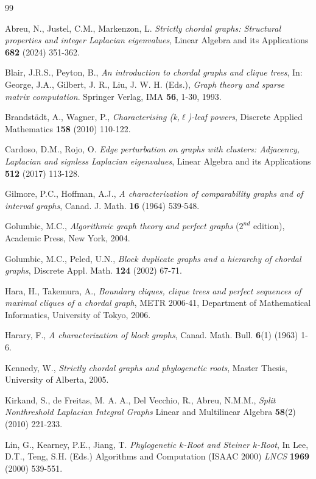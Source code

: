 \documentclass[preprint,12pt]{elsarticle}
\begin{document}
\begin{thebibliography}{99}

Abreu, N., Justel, C.M., Markenzon, L.
{\it Strictly chordal graphs: Structural properties and integer Laplacian eigenvalues},
Linear Algebra and its Applications {\bf 682} (2024) 351-362.

Blair, J.R.S., Peyton, B., 
{\it An introduction to chordal graphs and clique trees}, 
In:  George, J.A., Gilbert, J. R., Liu, J. W. H. (Eds.), 
\textit{Graph theory and sparse matrix computation}. Springer Verlag, IMA {\bf 56}, 1-30, 1993.

Brandstädt, A., Wagner, P.,
{\it Characterising (k,$\ell$)-leaf powers}, 
Discrete Applied Mathematics {\bf 158} (2010) 110-122.

Cardoso, D.M., Rojo, O. 
{\it Edge perturbation on graphs with clusters: Adjacency, Laplacian and signless Laplacian eigenvalues}, 
Linear Algebra and its Applications {\bf 512} (2017) 113-128.

Gilmore, P.C.,  Hoffman, A.J.,
{\it A characterization of comparability graphs and of interval graphs},
Canad. J. Math. {\bf 16} (1964) 539-548.

Golumbic, M.C., 
{\it Algorithmic graph theory and perfect graphs} ($2^{nd}$ edition), 
Academic Press, New York, 2004.

Golumbic, M.C., Peled, U.N.,
{\it Block duplicate graphs and a hierarchy of
chordal graphs},
Discrete Appl. Math. {\bf 124} (2002)   67-71.  

Hara, H., Takemura, A., 
{\it Boundary cliques, clique trees and perfect sequences of maximal cliques
of a chordal graph},  
METR 2006-41, Department of Mathematical Informatics, University of Tokyo, 2006.

Harary, F.,
{\it A characterization of block graphs}, 
Canad. Math. Bull. {\bf 6}(1) (1963) 1-6. 

Kennedy, W.,
{\it Strictly chordal graphs and phylogenetic roots}, 
Master Thesis, University of Alberta, 2005.

Kirkand, S., de Freitas, M. A. A., Del Vecchio, R., Abreu, N.M.M.,
{\it Split Nonthreshold Laplacian Integral Graphs} Linear and Multilinear Algebra {\bf 58}(2) (2010)  221-233. 

Lin, G., Kearney, P.E., Jiang, T.
{\it Phylogenetic $k$-Root and Steiner $k$-Root}, In Lee, D.T., Teng, S.H. (Eds.) Algorithms and Computation (ISAAC 2000) 
{\it LNCS} {\bf 1969} (2000) 539-551.


\end{thebibliography}
\end{document}
